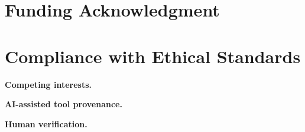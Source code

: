 {\footnotesize
\section*{Funding Acknowledgment}
\SubmissionFundingStatement

\section*{Compliance with Ethical Standards}
\SubmissionComplianceStatement

\noindent\textbf{Competing interests.} \SubmissionConflictStatement

\noindent\textbf{AI-assisted tool provenance.} \SubmissionToolDisclosure

\noindent\textbf{Human verification.} \SubmissionHumanVerificationStatement
}
